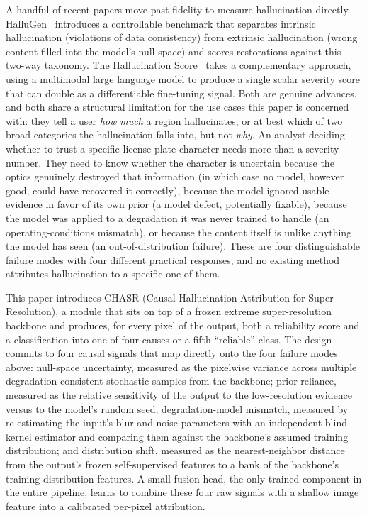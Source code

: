 \documentclass[review]{elsarticle}
\begin{document}
A handful of recent papers move past fidelity to measure hallucination directly. HalluGen~\citep{kim2025hallugen} introduces a controllable benchmark that separates intrinsic hallucination (violations of data consistency) from extrinsic hallucination (wrong content filled into the model's null space) and scores restorations against this two-way taxonomy. The Hallucination Score~\citep{ren2025hallucination} takes a complementary approach, using a multimodal large language model to produce a single scalar severity score that can double as a differentiable fine-tuning signal. Both are genuine advances, and both share a structural limitation for the use cases this paper is concerned with: they tell a user \emph{how much} a region hallucinates, or at best which of two broad categories the hallucination falls into, but not \emph{why}. An analyst deciding whether to trust a specific license-plate character needs more than a severity number. They need to know whether the character is uncertain because the optics genuinely destroyed that information (in which case no model, however good, could have recovered it correctly), because the model ignored usable evidence in favor of its own prior (a model defect, potentially fixable), because the model was applied to a degradation it was never trained to handle (an operating-conditions mismatch), or because the content itself is unlike anything the model has seen (an out-of-distribution failure). These are four distinguishable failure modes with four different practical responses, and no existing method attributes hallucination to a specific one of them.

This paper introduces CHASR (Causal Hallucination Attribution for Super-Resolution), a module that sits on top of a frozen extreme super-resolution backbone and produces, for every pixel of the output, both a reliability score and a classification into one of four causes or a fifth ``reliable'' class. The design commits to four causal signals that map directly onto the four failure modes above: null-space uncertainty, measured as the pixelwise variance across multiple degradation-consistent stochastic samples from the backbone; prior-reliance, measured as the relative sensitivity of the output to the low-resolution evidence versus to the model's random seed; degradation-model mismatch, measured by re-estimating the input's blur and noise parameters with an independent blind kernel estimator and comparing them against the backbone's assumed training distribution; and distribution shift, measured as the nearest-neighbor distance from the output's frozen self-supervised features to a bank of the backbone's training-distribution features. A small fusion head, the only trained component in the entire pipeline, learns to combine these four raw signals with a shallow image feature into a calibrated per-pixel attribution.
\end{document}
